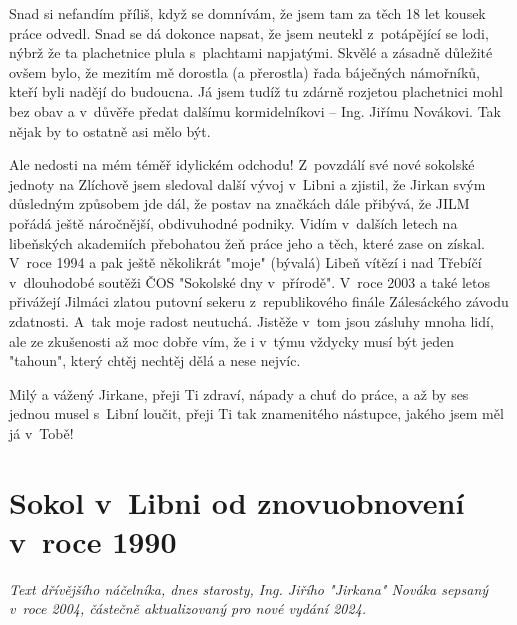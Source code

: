 \documentclass[a5paper, 11pt, twoside]{article}
\begin{document}
Snad si nefandím příliš, když se domnívám, že jsem tam za těch 18 let
kousek práce odvedl. Snad se dá dokonce napsat, že jsem neutekl
z~potápějící se lodi, nýbrž že ta plachetnice plula s~plachtami napjatými.
Skvělé a zásadně důležité ovšem bylo, že mezitím mě dorostla (a
přerostla) řada báječných námořníků, kteří byli nadějí do budoucna. Já
jsem tudíž tu zdárně rozjetou plachetnici mohl bez obav a v~důvěře
předat dalšímu kormidelníkovi -- Ing. Jiřímu Novákovi. Tak nějak by to
ostatně asi mělo být.

Ale nedosti na mém téměř idylickém odchodu! Z~povzdálí své nové sokolské
jednoty na Zlíchově jsem sledoval další vývoj v~Libni a zjistil, že
Jirkan svým důsledným způsobem jde dál, že postav na značkách dále
přibývá, že JILM pořádá ještě náročnější, obdivuhodné podniky. Vidím
v~dalších letech na libeňských akademiích přebohatou žeň práce jeho a
těch, které zase on získal. V~roce 1994 a pak ještě několikrát "moje"
(bývalá) Libeň vítězí i nad Třebíčí v~dlouhodobé soutěži ČOS "Sokolské
dny v~přírodě". V~roce 2003 a také letos přivážejí Jilmáci zlatou
putovní sekeru z~republikového finále Zálesáckého závodu zdatnosti.
A~tak moje radost neutuchá. Jistěže v~tom jsou zásluhy mnoha lidí, ale ze
zkušenosti až moc dobře vím, že i v~týmu vždycky musí být jeden
"tahoun", který chtěj nechtěj dělá a nese nejvíc.

Milý a vážený Jirkane, přeji Ti zdraví, nápady a chuť do práce, a až by
ses jednou musel s~Libní loučit, přeji Ti tak znamenitého nástupce,
jakého jsem měl já v~Tobě!

\clearpage

\section{Sokol v~Libni od znovuobnovení v~roce 1990}

\begin{center}
  \textit{Text dřívějšího náčelníka, dnes starosty, Ing. Jiřího "Jirkana"
  Nováka sepsaný v~roce 2004, částečně aktualizovaný pro nové vydání
  2024.}
\end{center}
\end{document}

